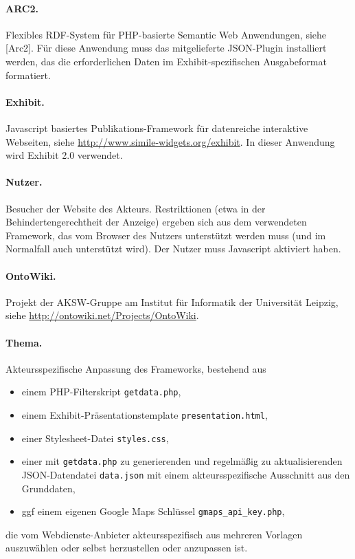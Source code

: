 \documentclass[11pt,a4paper]{article}
\begin{document}
\paragraph{ARC2.} 
Flexibles RDF-System für PHP-basierte Semantic Web Anwendungen, siehe [Arc2].
Für diese Anwendung muss das mitgelieferte JSON-Plugin installiert werden, das
die erforderlichen Daten im Exhibit-spezifischen Ausgabeformat formatiert. 

\paragraph{Exhibit.} 
Javascript basiertes Publikations-Framework für datenreiche interaktive
Webseiten, siehe \url{http://www.simile-widgets.org/exhibit}.  In dieser
Anwendung wird Exhibit 2.0 verwendet.

\paragraph{Nutzer.} 
Besucher der Website des Akteurs. Restriktionen (etwa in der
Behindertengerechtheit der Anzeige) ergeben sich aus dem verwendeten
Framework, das vom Browser des Nutzers unterstützt werden muss (und im
Normalfall auch unterstützt wird). Der Nutzer muss Javascript aktiviert haben.

\paragraph{OntoWiki.} 
Projekt der AKSW-Gruppe am Institut für Informatik der Universität Leipzig,
siehe \url{http://ontowiki.net/Projects/OntoWiki}.

\paragraph{Thema.} 
Akteursspezifische Anpassung des Frameworks, bestehend aus 
\begin{itemize}
\item einem PHP-Filterskript \texttt{getdata.php},
\item einem Exhibit-Präsentationstemplate \texttt{presentation.html},
\item einer Stylesheet-Datei \texttt{styles.css},
\item einer mit \texttt{getdata.php} zu generierenden und regelmäßig zu
  aktualisierenden JSON-Datendatei \texttt{data.json} mit einem
  akteursspezifische Ausschnitt aus den Grunddaten,
\item ggf einem eigenen Google Maps Schlüssel \texttt{gmaps\_api\_key.php},
\end{itemize}
die vom Webdienste-Anbieter akteursspezifisch aus mehreren Vorlagen
auszuwählen oder selbst herzustellen oder anzupassen ist.
\end{document}
